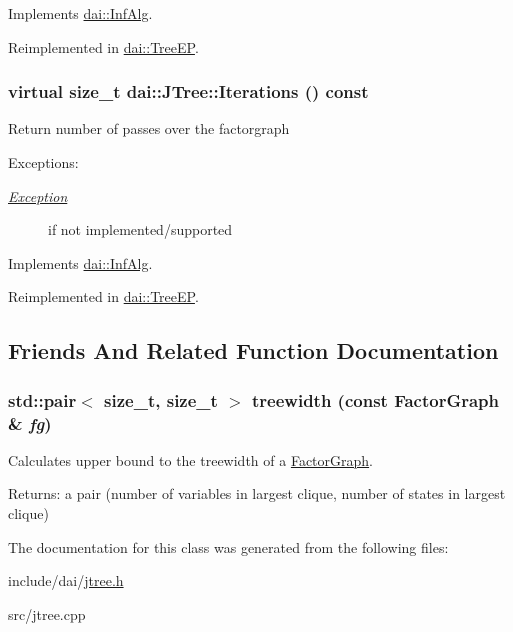 Implements \hyperlink{classdai_1_1InfAlg_7e1ca7da15403d5d2af4a855186c0b46}{dai::InfAlg}.

Reimplemented in \hyperlink{classdai_1_1TreeEP_d1214cd7bc0899d1a8dc4523bacdb488}{dai::TreeEP}.\hypertarget{classdai_1_1JTree_71cd98f072d69f6ce60af8b52ef02eb8}{
\subsubsection[Iterations]{\setlength{\rightskip}{0pt plus 5cm}virtual size\_\-t dai::JTree::Iterations () const}}
\label{classdai_1_1JTree_71cd98f072d69f6ce60af8b52ef02eb8}


Return number of passes over the factorgraph \begin{Desc}
\item[Exceptions:]
\begin{description}
\item[{\em \hyperlink{classdai_1_1Exception}{Exception}}]if not implemented/supported \end{description}
\end{Desc}


Implements \hyperlink{classdai_1_1InfAlg_7a93807863cc0a2025c1a78bdf1e14b8}{dai::InfAlg}.

Reimplemented in \hyperlink{classdai_1_1TreeEP_e18e681d1f078e42445d39f8605df7d4}{dai::TreeEP}.

\subsection{Friends And Related Function Documentation}
\hypertarget{classdai_1_1JTree_bca2633ffb8701cb62c54241bdad307e}{
\subsubsection[treewidth]{\setlength{\rightskip}{0pt plus 5cm}std::pair$<$ size\_\-t, size\_\-t $>$ treewidth (const {\bf FactorGraph} \& {\em fg})}}
\label{classdai_1_1JTree_bca2633ffb8701cb62c54241bdad307e}


Calculates upper bound to the treewidth of a \hyperlink{classdai_1_1FactorGraph}{FactorGraph}. 

\begin{Desc}
\item[Returns:]a pair (number of variables in largest clique, number of states in largest clique) \end{Desc}


The documentation for this class was generated from the following files:\begin{CompactItemize}
\item 
include/dai/\hyperlink{jtree_8h}{jtree.h}\item 
src/jtree.cpp\end{CompactItemize}
